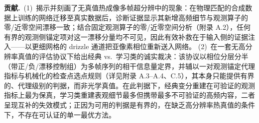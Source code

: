 \textbf{贡献.}\ 
(1)~揭示并刻画了无真值热成像多帧超分辨中的现象：在物理匹配的合成数据上训练的网络迁移至真实数据后，诊断证据显示其新增高频细节与观测算子的零/近零空间漂移一致；结合固定观测算子的零/近零空间分析（附录 A.2），任何有界的观测侧锚定项对这一漂移分量均不可见，因此有效补救在于输入侧的证据注入——以更细网格的 drizzle 通道把亚像素相位重新送入网络。
(2)~在一套无高分辨率真值的评估协议下给出经典 vs.\ 学习类的诚实裁决：该协议以相位分层分半 \eng{FRC}（带正/负/漂移控制组）为多帧序列的相干信息量定界，并辅以一对观测锚定代理指标与机械化的检查点选点规则（详见附录 A.3--A.4、C.5），其本身只能提供有界的、代理级别的判据，而非光学真值。在此判据下，经典变分重建在可验证的观测指标上最为保真，学习类重建表观细节最多但携带最多不可验证的高频内容，二者呈现互补的失效模式；正因为可用的判据是有界的，在缺乏高分辨率热真值的条件下，不存在可认证的单一最优方法。
